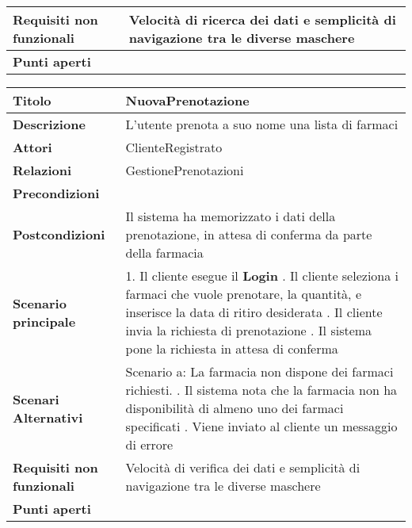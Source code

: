 \begin{tabular} {|P{4.5cm}|P{12.5cm}|}
\hline
  \textbf{Requisiti non funzionali} & Velocità di ricerca dei dati e semplicità di navigazione tra le diverse maschere\\
\hline
  \textbf{Punti aperti} &\\
\hline
\end{tabular}
\hfill
\break

\begin{tabular} {|P{4.5cm}|P{12.5cm}|}
\hline
  \textbf{Titolo} & NuovaPrenotazione\\
\hline
  \textbf{Descrizione} & L'utente prenota a suo nome una lista di farmaci\\
\hline
  \textbf{Attori} & ClienteRegistrato\\
\hline
  \textbf{Relazioni} & GestionePrenotazioni\\
\hline
  \textbf{Precondizioni} &\\
\hline
  \textbf{Postcondizioni} & Il sistema ha memorizzato i dati della prenotazione, in attesa di conferma da parte della farmacia\\
\hline
  \textbf{Scenario principale} & 1. Il cliente esegue il \textbf{Login} . Il cliente seleziona i farmaci che vuole prenotare, la quantità, e inserisce la data di ritiro desiderata . Il cliente invia la richiesta di prenotazione . Il sistema pone la richiesta in attesa di conferma\\
\hline
  \textbf{Scenari Alternativi} & Scenario a: La farmacia non dispone dei farmaci richiesti. . Il sistema nota che la farmacia non ha disponibilità di almeno uno dei farmaci specificati . Viene inviato al cliente un messaggio di errore\\
\hline
  \textbf{Requisiti non funzionali} & Velocità di verifica dei dati e semplicità di navigazione tra le diverse maschere\\
\hline
  \textbf{Punti aperti} &\\
\hline
\end{tabular}
\hfill
\break


